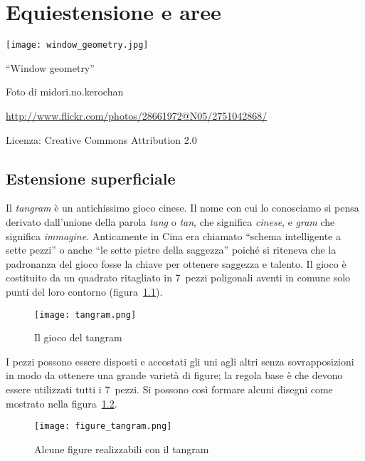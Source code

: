 \chapter{Equiestensione e aree}

\texttt{[image: window\_geometry.jpg]}
  \begin{center}
    {\large ``Window geometry''}\par
    Foto di midori.no.kerochan\par
    \url{http://www.flickr.com/photos/28661972@N05/2751042868/}\par
    Licenza: Creative Commons Attribution 2.0\par
  \end{center}
\newpage


\section{Estensione superficiale}

Il \emph{tangram}\label{tangram} è un antichissimo gioco cinese. Il nome con cui lo conosciamo si pensa derivato dall'unione della parola \emph{tang} o \emph{tan}, che significa \emph{cinese}, e \emph{gram} che significa \emph{immagine}. Anticamente in Cina era chiamato ``schema intelligente a sette pezzi'' o anche ``le sette pietre della saggezza'' poiché si riteneva che la padronanza del gioco fosse la chiave per ottenere saggezza e talento.
Il gioco è costituito da un quadrato ritagliato in 7~pezzi poligonali aventi in comune solo punti del loro contorno (figura~\ref{fig:tangram}).

\begin{figure}[!htb]
	\centering\texttt{[image: tangram.png]}
	\caption{Il gioco del tangram}\label{fig:tangram}
\end{figure}

I pezzi possono essere disposti e accostati gli uni agli altri senza sovrapposizioni in modo da ottenere una grande varietà di figure; la regola base è che devono essere utilizzati tutti i 7~pezzi. Si possono così formare alcuni disegni come mostrato nella figura~\ref{fig:figure_tangram}.

\begin{figure}[!htb]
	\centering\texttt{[image: figure\_tangram.png]}
	\caption{Alcune figure realizzabili con il tangram}\label{fig:figure_tangram}
\end{figure}

